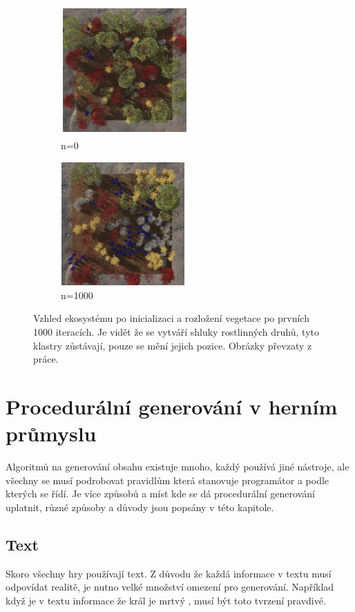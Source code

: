 \begin{figure}[h]
	\centering
	\begin{subfigure}{0.475\textwidth}
		\centering
		\includegraphics[scale=1]{obrazky-figures/treesStart.png}
		\caption{n=0}
	\end{subfigure}
	\begin{subfigure}{0.475\textwidth}
		\centering
		\includegraphics[scale=1]{obrazky-figures/treesEnd.png}
		\caption{n=1000}
	\end{subfigure}
	\caption[generatedTrees]{Vzhled ekosystému po inicializaci a rozložení vegetace po prvních 1000 iteracích. Je vidět že se vytváří shluky rostlinných druhů, tyto klastry zůstávají, pouze se mění jejich pozice. Obrázky převzaty z práce\footnotemark.}
\end{figure}

\section{Procedurální generování v herním průmyslu}
\label{proceduralInGames}
Algoritmů na generování obsahu existuje mnoho, každý používá jiné nástroje, ale všechny se musí podrobovat pravidlům která stanovuje programátor a podle kterých se řídí. Je více způsobů a míst kde se dá procedurální generování uplatnit, různé způsoby a důvody jsou popsány v této kapitole.

\subsection{Text}
Skoro všechny hry používají text. Z důvodu že každá informace v textu musí odpovídat realitě, je nutno velké množství omezení pro generování. Například když je v textu informace že král je mrtvý \cite{liuDeep}, musí být toto tvrzení pravdivé.

